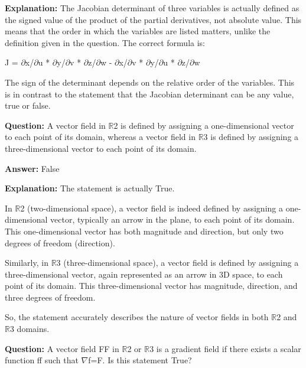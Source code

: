 \documentclass{article}
\begin{document}
                \textbf{Explanation:} The Jacobian determinant of three variables is actually defined as the signed value of the product of the partial derivatives, not absolute value. This means that the order in which the variables are listed matters, unlike the definition given in the question. The correct formula is:

J = \ensuremath{\partial}x/\ensuremath{\partial}u * \ensuremath{\partial}y/\ensuremath{\partial}v * \ensuremath{\partial}z/\ensuremath{\partial}w - \ensuremath{\partial}x/\ensuremath{\partial}v * \ensuremath{\partial}y/\ensuremath{\partial}u * \ensuremath{\partial}z/\ensuremath{\partial}w

The sign of the determinant depends on the relative order of the variables. This is in contrast to the statement that the Jacobian determinant can be any value, true or false.
                
                \vspace{0.5cm} 
        
            
                \textbf {Question:} A vector field in \ensuremath{\mathbb{R}}2 is defined by assigning a one-dimensional vector to each point of its domain, whereas a vector field in \ensuremath{\mathbb{R}}3 is defined by assigning a three-dimensional vector to each point of its domain.
                
                \textbf{Answer:} False

                \textbf{Explanation:} The statement is actually True.

In \ensuremath{\mathbb{R}}2 (two-dimensional space), a vector field is indeed defined by assigning a one-dimensional vector, typically an arrow in the plane, to each point of its domain. This one-dimensional vector has both magnitude and direction, but only two degrees of freedom (direction).

Similarly, in \ensuremath{\mathbb{R}}3 (three-dimensional space), a vector field is defined by assigning a three-dimensional vector, again represented as an arrow in 3D space, to each point of its domain. This three-dimensional vector has magnitude, direction, and three degrees of freedom.

So, the statement accurately describes the nature of vector fields in both \ensuremath{\mathbb{R}}2 and \ensuremath{\mathbb{R}}3 domains.
                
                \vspace{0.5cm} 
        
            
                \textbf {Question:} A vector field FF in \ensuremath{\mathbb{R}}2 or \ensuremath{\mathbb{R}}3 is a gradient field if there exists a scalar function ff such that \ensuremath{\nabla}f=F. Is this statement True?
                
\end{document}
